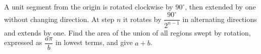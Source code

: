 A unit segment from the origin is rotated clockwise by $90^\circ$, then extended by one without changing direction. At step $n$ it rotates by $\dfrac{90^\circ}{2^{n-1}}$ in alternating directions and extends by one. Find the area of the union of all regions swept by rotation, expressed as $\dfrac{a\pi}{b}$ in lowest terms, and give $a+b$.
